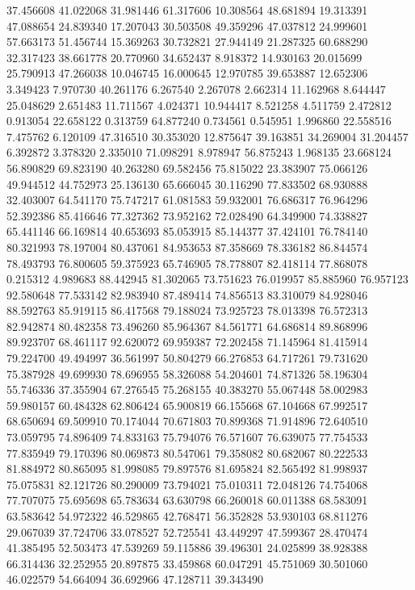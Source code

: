 37.456608
41.022068
31.981446
61.317606
10.308564
48.681894
19.313391
47.088654
24.839340
17.207043
30.503508
49.359296
47.037812
24.999601
57.663173
51.456744
15.369263
30.732821
27.944149
21.287325
60.688290
32.317423
38.661778
20.770960
34.652437
8.918372
14.930163
20.015699
25.790913
47.266038
10.046745
16.000645
12.970785
39.653887
12.652306
3.349423
7.970730
40.261176
6.267540
2.267078
2.662314
11.162968
8.644447
25.048629
2.651483
11.711567
4.024371
10.944417
8.521258
4.511759
2.472812
0.913054
22.658122
0.313759
64.877240
0.734561
0.545951
1.996860
22.558516
7.475762
6.120109
47.316510
30.353020
12.875647
39.163851
34.269004
31.204457
6.392872
3.378320
2.335010
71.098291
8.978947
56.875243
1.968135
23.668124
56.890829
69.823190
40.263280
69.582456
75.815022
23.383907
75.066126
49.944512
44.752973
25.136130
65.666045
30.116290
77.833502
68.930888
32.403007
64.541170
75.747217
61.081583
59.932001
76.686317
76.964296
52.392386
85.416646
77.327362
73.952162
72.028490
64.349900
74.338827
65.441146
66.169814
40.653693
85.053915
85.144377
37.424101
76.784140
80.321993
78.197004
80.437061
84.953653
87.358669
78.336182
86.844574
78.493793
76.800605
59.375923
65.746905
78.778807
82.418114
77.868078
0.215312
4.989683
88.442945
81.302065
73.751623
76.019957
85.885960
76.957123
92.580648
77.533142
82.983940
87.489414
74.856513
83.310079
84.928046
88.592763
85.919115
86.417568
79.188024
73.925723
78.013398
76.572313
82.942874
80.482358
73.496260
85.964367
84.561771
64.686814
89.868996
89.923707
68.461117
92.620072
69.959387
72.202458
71.145964
81.415914
79.224700
49.494997
36.561997
50.804279
66.276853
64.717261
79.731620
75.387928
49.699930
78.696955
58.326088
54.204601
74.871326
58.196304
55.746336
37.355904
67.276545
75.268155
40.383270
55.067448
58.002983
59.980157
60.484328
62.806424
65.900819
66.155668
67.104668
67.992517
68.650694
69.509910
70.174044
70.671803
70.899368
71.914896
72.640510
73.059795
74.896409
74.833163
75.794076
76.571607
76.639075
77.754533
77.835949
79.170396
80.069873
80.547061
79.358082
80.682067
80.222533
81.884972
80.865095
81.998085
79.897576
81.695824
82.565492
81.998937
75.075831
82.121726
80.290009
73.794021
75.010311
72.048126
74.754068
77.707075
75.695698
65.783634
63.630798
66.260018
60.011388
68.583091
63.583642
54.972322
46.529865
42.768471
56.352828
53.930103
68.811276
29.067039
37.724706
33.078527
52.725541
43.449297
47.599367
28.470474
41.385495
52.503473
47.539269
59.115886
39.496301
24.025899
38.928388
66.314436
32.252955
20.897875
33.459868
60.047291
45.751069
30.501060
46.022579
54.664094
36.692966
47.128711
39.343490
